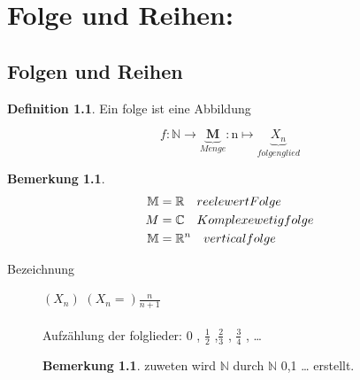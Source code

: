\documentclass[a4paper,12pt,leqno]{report}
\theoremstyle{plain} %
\theoremstyle{definition} %
\newtheorem{remark}[theorem]{Bemerkung}
\newtheorem{definition}[theorem]{Definition}
\begin{document}
\chapter{Folge und Reihen:}
\section{Folgen und Reihen}

\begin{definition}
 Ein folge ist eine Abbildung
 
\[ f: \mathbb{N} \rightarrow \underbrace{\mathbf{M}}_{Menge} : \mathrm{n} \mapsto \underbrace{X_n}_{folgenglied} \]

\end{definition}
\begin{remark}
	
	\begin{align}	\mathbb{M} &= \mathbb{R} \quad reelewert Folge  \notag \\
	M&= \mathbb{C} \quad	 Komplexewetig folge  \notag \\
	\mathbb{M}&= \mathbb{R}^n \quad vertical folge \notag
	\end{align}	
	

	
	
\end{remark}
\begin{description}
	
	\item[Bezeichnung]
	
	 \quad $(X_n)$ \space {} \space $ \left( X_n =  \right) \frac{n}{n+1} $
	\\ \\ Aufzählung der folglieder: 0 , $\frac{1}{2}$ ,$\frac{2}{3}$ , $\frac{3}{4}$ , \dots
	\begin{remark}
		zuweten wird $\mathbb{N}$ durch $\mathbb{N}$ {0,1 \dots} erstellt. 
		
		
	\end{remark}
\end{description} 
\end{document}
